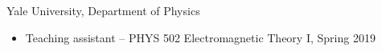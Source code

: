 \documentclass[margin,line,pifont,palatino,courier]{res}
\begin{document}
\begin{resume}
\begin{itemize}
\end{itemize}
Yale University, Department of Physics

\begin{itemize}
\setlength\itemsep{0em}
	\item Teaching assistant -- PHYS 502 Electromagnetic Theory I, Spring 2019
\end{itemize}



\end{resume}
\end{document}
